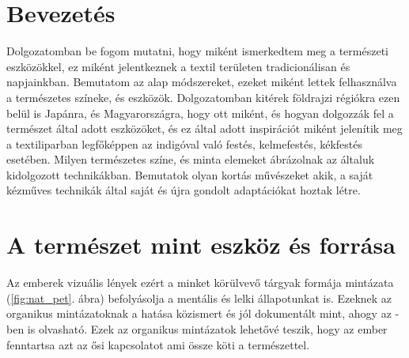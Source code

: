 \documentclass[fontsize=12pt, appendixprefix=true]{scrreprt}
\begin{document}




\tableofcontents


\chapter{Bevezetés}
Dolgozatomban be fogom mutatni, hogy miként ismerkedtem  meg a természeti eszközökkel, ez miként jelentkeznek a textil területen tradicionálisan és napjainkban.
Bemutatom az alap módszereket, ezeket miként lettek felhasználva a természetes színeke, és eszközök.
Dolgozatomban kitérek földrajzi régiókra ezen belül is Japánra, és Magyarországra, hogy ott miként, és hogyan dolgozzák fel a természet által adott eszközöket, és ez által adott inspirációt miként jelenítik meg a textiliparban legfőképpen az indigóval való festés, kelmefestés, kékfestés esetében.
Milyen természetes színe, és minta elemeket ábrázolnak az általuk kidolgozott technikákban.
Bemutatok olyan kortás művészeket akik, a saját kézműves technikák által saját és újra gondolt adaptációkat hoztak létre.



\chapter{A természet mint eszköz és forrása}

Az emberek vizuális lények ezért a minket körülvevő tárgyak formája mintázata (\ref{fig:nat_pet}. ábra) befolyásolja a mentális és lelki állapotunkat is. Ezeknek az organikus mintázatoknak a hatása közismert és jól dokumentált mint, ahogy az \cite{jo2019physiological} -ben is olvasható. Ezek az organikus mintázatok lehetővé teszik, hogy az ember fenntartsa azt az ősi kapcsolatot ami össze köti a természettel. 
\end{document}
